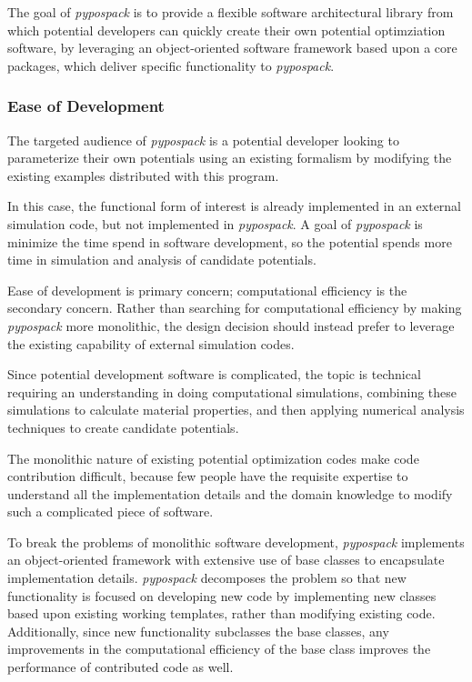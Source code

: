 The goal of \emph{pypospack} is to provide a flexible software architectural library from which potential developers can quickly create their own potential optimziation software, by leveraging an object-oriented software framework based upon a core packages, which deliver specific functionality to \emph{pypospack}.

\subsubsection{Ease of Development}

The targeted audience of \emph{pypospack} is a potential developer looking  to parameterize their own potentials using an existing formalism by modifying the existing examples distributed with this program.

In this case, the functional form of interest is already implemented in an external simulation code, but not implemented in \emph{pypospack}.  A goal of \emph{pypospack} is minimize the time spend in software development, so the potential spends more time in simulation and analysis of candidate potentials.

Ease of development is primary concern; computational efficiency is the secondary concern.  Rather than searching for computational efficiency by making \emph{pypospack} more monolithic, the design decision should instead prefer to leverage the existing capability of external simulation codes.

Since potential development software is complicated, the topic is technical requiring an understanding in doing computational simulations, combining these simulations to calculate material properties, and then applying numerical analysis techniques to create candidate potentials.

The monolithic nature of existing potential optimization codes make code contribution difficult, because few people have the requisite expertise to understand all the implementation details and the domain knowledge to modify such a complicated piece of software.

To break the problems of monolithic software development, \emph{pypospack} implements an object-oriented framework with extensive use of base classes to encapsulate implementation details. \emph{pypospack} decomposes the problem so that new functionality is focused on developing new code by implementing new classes based upon existing working templates, rather than modifying existing code.  Additionally, since new functionality subclasses the base classes, any improvements in the computational efficiency of the base class improves the performance of contributed code as well.

